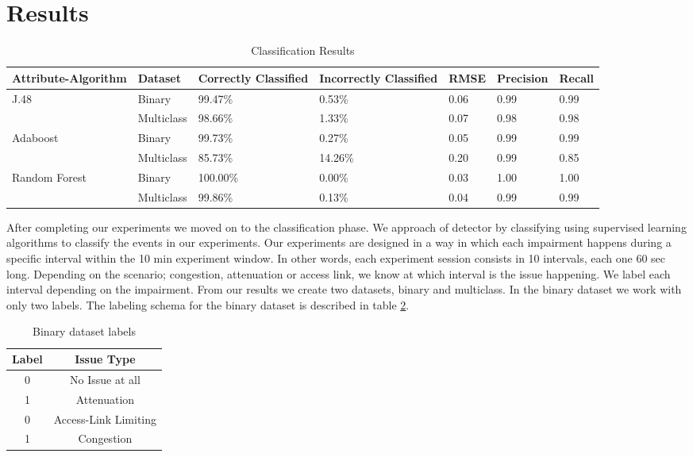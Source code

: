 \section{Results}\label{Results}

\begin{table}[bp]
	\begin{center}
		\begin{tabular}{|| m{2.5cm} | m{2cm} | m{2cm}| m{2cm} | m{2cm}| m{2cm} | m{2cm}  ||}
			\hline
			 Attribute-Algorithm & Dataset & Correctly Classified & Incorrectly Classified & RMSE & Precision & Recall \\ [0.5ex] 
			\hline\hline
			\multirow{2}{*}{J.48} & Binary & 99.47\% & 0.53\% & 0.06 & 0.99 & 0.99 \\
			& Multiclass & 98.66\% & 1.33\% & 0.07 & 0.98 & 0.98 \\
			\multirow{2}{*}{Adaboost} & Binary & 99.73\% & 0.27\% & 0.05 & 0.99 & 0.99 \\
			& Multiclass & 85.73\% & 14.26\% & 0.20 & 0.99 & 0.85 \\
			\multirow{2}{*}{Random Forest} & Binary & 100.00\% & 0.00\% & 0.03 & 1.00 & 1.00 \\
			& Multiclass & 99.86\% & 0.13\% & 0.04 & 0.99 & 0.99 \\
			\hline
		\end{tabular}
		\caption{Classification Results}
		\label{table:classification_results}
	\end{center}
\end{table}

After completing our experiments we moved on to the classification phase. We approach of detector by classifying using supervised learning algorithms to classify the events in our experiments. Our experiments are designed in a way in which each impairment happens during a specific interval within the 10 min experiment window. In other words, each experiment session consists in 10 intervals, each one 60 sec long. Depending on the scenario; congestion, attenuation or access link, we know at which interval is the issue happening. We label each interval depending on the impairment. From our results we create two datasets, binary and multiclass. In the binary dataset we work with only two labels. The labeling schema for the binary dataset is described in table \ref{table:binary_labels}.

\begin{table}[!h]
	\begin{center}
		\begin{tabular}{||c c||} 
			\hline
			Label & Issue Type\\ [0.5ex] 
			\hline\hline
			0 & No Issue at all \\ 
			\hline
			1 & Attenuation\\
			\hline
			0 & Access-Link Limiting \\
			\hline
			1 & Congestion \\[1ex] 
			\hline
		\end{tabular}
		\caption{Binary dataset labels}
		\label{table:binary_labels}
	\end{center}
\end{table}

